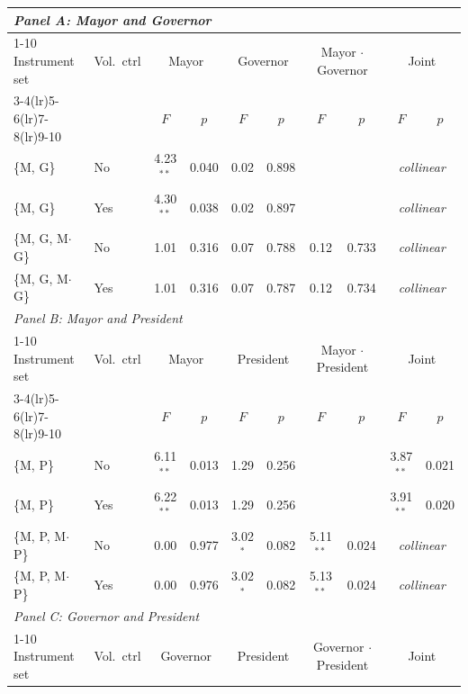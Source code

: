 \begin{tabular}{@{}llcccccccc@{}}
\toprule
\multicolumn{10}{l}{\textit{Panel A: Mayor and Governor}} \\
\cmidrule(lr){1-10}
Instrument set & Vol.\ ctrl & \multicolumn{2}{c}{Mayor} & \multicolumn{2}{c}{Governor} & \multicolumn{2}{c}{Mayor $\cdot$ Governor} & \multicolumn{2}{c}{Joint} \\
\cmidrule(lr){3-4}\cmidrule(lr){5-6}\cmidrule(lr){7-8}\cmidrule(lr){9-10}
 & & $F$ & $p$ & $F$ & $p$ & $F$ & $p$ & $F$ & $p$ \\
\midrule
\{M, G\} & No & 4.23$^{**}$ & 0.040 & 0.02 & 0.898 &  &  & \multicolumn{2}{c}{\textit{collinear}} \\
\{M, G\} & Yes & 4.30$^{**}$ & 0.038 & 0.02 & 0.897 &  &  & \multicolumn{2}{c}{\textit{collinear}} \\
\{M, G, M$\cdot$G\} & No & 1.01 & 0.316 & 0.07 & 0.788 & 0.12 & 0.733 & \multicolumn{2}{c}{\textit{collinear}} \\
\{M, G, M$\cdot$G\} & Yes & 1.01 & 0.316 & 0.07 & 0.787 & 0.12 & 0.734 & \multicolumn{2}{c}{\textit{collinear}} \\
\midrule
\multicolumn{10}{l}{\textit{Panel B: Mayor and President}} \\
\cmidrule(lr){1-10}
Instrument set & Vol.\ ctrl & \multicolumn{2}{c}{Mayor} & \multicolumn{2}{c}{President} & \multicolumn{2}{c}{Mayor $\cdot$ President} & \multicolumn{2}{c}{Joint} \\
\cmidrule(lr){3-4}\cmidrule(lr){5-6}\cmidrule(lr){7-8}\cmidrule(lr){9-10}
 & & $F$ & $p$ & $F$ & $p$ & $F$ & $p$ & $F$ & $p$ \\
\midrule
\{M, P\} & No & 6.11$^{**}$ & 0.013 & 1.29 & 0.256 &  &  & 3.87$^{**}$ & 0.021 \\
\{M, P\} & Yes & 6.22$^{**}$ & 0.013 & 1.29 & 0.256 &  &  & 3.91$^{**}$ & 0.020 \\
\{M, P, M$\cdot$P\} & No & 0.00 & 0.977 & 3.02$^{*}$ & 0.082 & 5.11$^{**}$ & 0.024 & \multicolumn{2}{c}{\textit{collinear}} \\
\{M, P, M$\cdot$P\} & Yes & 0.00 & 0.976 & 3.02$^{*}$ & 0.082 & 5.13$^{**}$ & 0.024 & \multicolumn{2}{c}{\textit{collinear}} \\
\midrule
\multicolumn{10}{l}{\textit{Panel C: Governor and President}} \\
\cmidrule(lr){1-10}
Instrument set & Vol.\ ctrl & \multicolumn{2}{c}{Governor} & \multicolumn{2}{c}{President} & \multicolumn{2}{c}{Governor $\cdot$ President} & \multicolumn{2}{c}{Joint} \\

\end{tabular}
